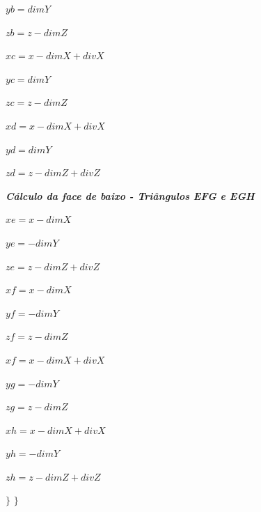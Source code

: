 \documentclass[12pt]{article}
\begin{document}
\par$yb = dimY$ \newline
\par$zb = z - dimZ$ \newline\newline
\par$xc = x - dimX + divX$ \newline
\par$yc = dimY$ \newline
\par$zc = z - dimZ$ \newline\newline
\par$xd = x - dimX + divX$ \newline
\par$yd = dimY$ \newline
\par$zd = z - dimZ + divZ$ \newline\newline
\par\textit{\textbf{Cálculo da face de baixo - Triângulos EFG e EGH}} \newline
\par$xe = x - dimX$ \newline
\par$ye = -dimY$ \newline
\par$ze = z-dimZ+divZ$ \newline\newline
\par$xf = x - dimX$ \newline
\par$yf = -dimY$ \newline
\par$zf = z - dimZ$ \newline\newline
\par$xf = x - dimX + divX$ \newline
\par$yg = -dimY$ \newline
\par$zg = z - dimZ$ \newline\newline
\par$xh = x - dimX + divX$ \newline
\par$yh = -dimY$ \newline
\par$zh = z - dimZ + divZ$ \newline\newline
\par $\}$ \newline
$\}$\newline\newline
\end{document}
